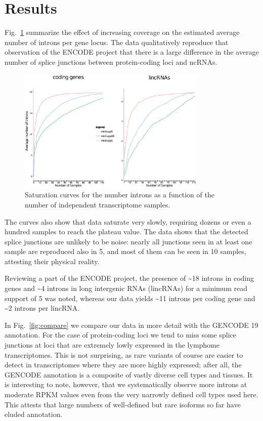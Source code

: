 \documentclass[ncrna,article,submit,moreauthors,pdftex,10pt,a4paper]{mdpi}
\begin{document}
\section{Results}

Fig.~\ref{fig:saturation} summarize the effect of increasing coverage on
the estimated average number of introns per gene locus. The data
qualitatively reproduce that observation of the ENCODE project that there is
a large difference in the average number of splice junctions between
protein-coding loci and ncRNAs. 

\begin{figure}[t]
\begin{center}
  \includegraphics[width=0.8\textwidth]{saturation}
\end{center}
\caption{Saturation curves for the number introns as a function of the 
    number of independent transcriptome samples.}
  \label{fig:saturation} 
\end{figure}

The curves also show that data saturate very slowly, requiring dozens or
even a hundred samples to reach the plateau value. The data shows that the
detected splice junctions are unlikely to be noise: nearly all junctions
seen in at least one sample are reproduced also in 5, and most of them can
be seen in 10 samples, attesting their physical reality. 

Reviewing a part of the ENCODE project, the presence of \textasciitilde{}18 introns in coding genes and \textasciitilde{}4 introns in long intergenic RNAs (lincRNAs) for a minimum read support of 5 was noted, whereas our data yields \textasciitilde{}11 introns per coding gene and \textasciitilde{}2 introns per lincRNA.

In Fig.~\ref{fig:compare} we compare our data in more detail with the
GENCODE 19 annotation. For the case of protein-coding loci we tend to miss
some splice junctions at loci that are extremely lowly expressed in the
lymphome transcriptomes. This is not surprising, as rare variants of course
are easier to detect in transcriptomes where they are more highly
expressed; after all, the GENCODE annotation is a composite of vastly
diverse cell types and tissues. It is interesting to note, however, that we
systematically observe more introns at moderate RPKM values even from the
very narrowly defined cell types used here. This attests that large numbers
of well-defined but rare isoforms so far have eluded annotation. 
\end{document}
